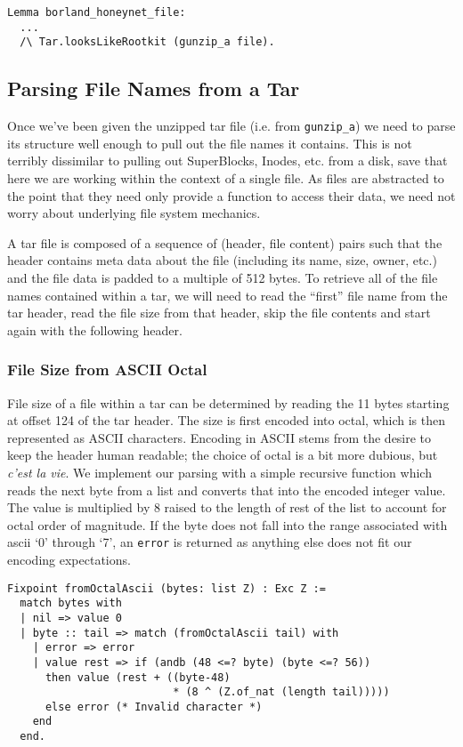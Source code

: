 \documentclass[nocopyrightspace]{sigplanconf}
\begin{document}
\begin{lstlisting}
Lemma borland_honeynet_file:
  ...
  /\ Tar.looksLikeRootkit (gunzip_a file).
\end{lstlisting}

\subsection{Parsing File Names from a Tar}
Once we've been given the unzipped tar file (i.e. from {\tt gunzip\_a}) we
need to parse its structure well enough to pull out the file names it
contains. This is not terribly dissimilar to pulling out SuperBlocks, Inodes,
etc. from a disk, save that here we are working within the context of a single
file. As files are abstracted to the point that they need only provide a
function to access their data, we need not worry about underlying file system
mechanics.

A tar file is composed of a sequence of (header, file content) pairs such that
the header contains meta data about the file (including its name, size, owner,
etc.) and the file data is padded to a multiple of 512 bytes. To retrieve all
of the file names contained within a tar, we will need to read the ``first''
file name from the tar header, read the file size from that header, skip the
file contents and start again with the following header.

\subsubsection{File Size from ASCII Octal}
File size of a file within a tar can be determined by reading the 11 bytes
starting at offset 124 of the tar header. The size is first encoded into
octal, which is then represented as ASCII characters. Encoding in ASCII stems
from the desire to keep the header human readable; the choice of octal is a
bit more dubious, but {\it c'est la vie}. We implement our parsing with a
simple recursive function which reads the next byte from a list and converts
that into the encoded integer value. The value is multiplied by 8 raised to
the length of rest of the list to account for octal order of magnitude. If the
byte does not fall into the range associated with ascii `0' through `7', an
{\tt error} is returned as anything else does not fit our encoding
expectations.

\begin{lstlisting}
Fixpoint fromOctalAscii (bytes: list Z) : Exc Z :=
  match bytes with
  | nil => value 0
  | byte :: tail => match (fromOctalAscii tail) with
    | error => error
    | value rest => if (andb (48 <=? byte) (byte <=? 56))
      then value (rest + ((byte-48)
                          * (8 ^ (Z.of_nat (length tail)))))
      else error (* Invalid character *)
    end
  end.
\end{lstlisting}
\end{document}
